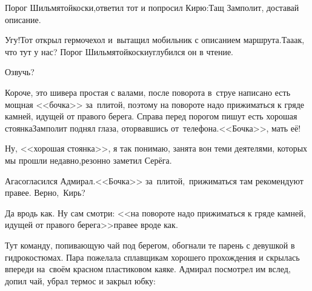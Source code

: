 \diagdash Порог Шильмятойкоски,\mdash ответил тот и попросил Кирю:\mdash Тащ Замполит, доставай описание.%


\diagdash Угу!\mdash Тот открыл гермочехол и~вытащил мобильник с описанием маршрута.\mdash Та\sdash а\sdash ак, что тут у нас? Порог Шильмятойкоски\myldots{}\mdash углубился он в чтение.

\diagdash Озвучь?

\diagdash Короче, это шивера простая с валами, после поворота в~струе написано есть мощная <<бочка>> за~плитой, поэтому на повороте надо прижиматься к гряде камней, идущей от правого берега. Справа перед порогом пишут есть хорошая стоянка\myldots{}\mdash Замполит поднял глаза, оторвавшись от~телефона.\mdash <<Бочка>>, мать её!


\diagdash Ну, <<хорошая стоянка>>, я так понимаю, занята вон теми деятелями, которых мы прошли недавно,\mdash резонно заметил Серёга.

\diagdash Ага\myldots{}\mdash согласился Адмирал.\mdash<<Бочка>> за~плитой,~прижиматься там рекомендуют правее. Верно,~Кирь?

\diagdash Да вродь как. Ну сам смотри: <<\myldots{}на повороте надо прижиматься к гряде камней, идущей от правого берега\myldots{}>>\mdash правее вроде как.

Тут команду, попивающую чай под берегом, обогнали те парень с девушкой в гидрокостюмах. Пара пожелала сплавщикам хорошего прохождения и скрылась впереди на~своём красном пластиковом каяке. Адмирал посмотрел им вслед, допил чай, убрал термос и закрыл юбку:

